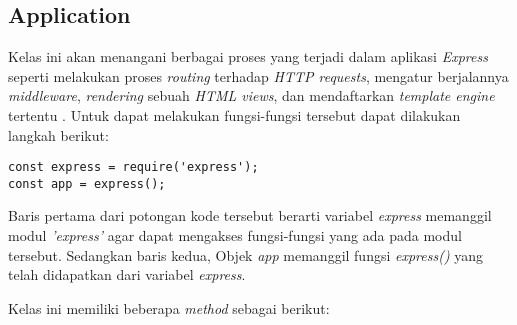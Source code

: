 \subsection{Application}
Kelas ini akan menangani berbagai proses yang terjadi dalam aplikasi \textit{Express} seperti melakukan proses \textit{routing} terhadap \textit{HTTP requests}, mengatur berjalannya \textit{middleware}, \textit{rendering} sebuah \textit{HTML views}, dan mendaftarkan \textit{template engine} tertentu \cite{tj:10:expressjsapi}. Untuk dapat melakukan fungsi-fungsi tersebut dapat dilakukan langkah berikut:

\begin{lstlisting}
const express = require('express');
const app = express();
\end{lstlisting}

Baris pertama dari potongan kode tersebut berarti variabel \textit{express} memanggil modul \textit{'express'} agar dapat mengakses fungsi-fungsi yang ada pada modul tersebut. Sedangkan baris kedua, Objek \textit{app} memanggil fungsi \textit{express()} yang telah didapatkan dari variabel \textit{express}.

Kelas ini memiliki beberapa \textit{method} sebagai berikut:

